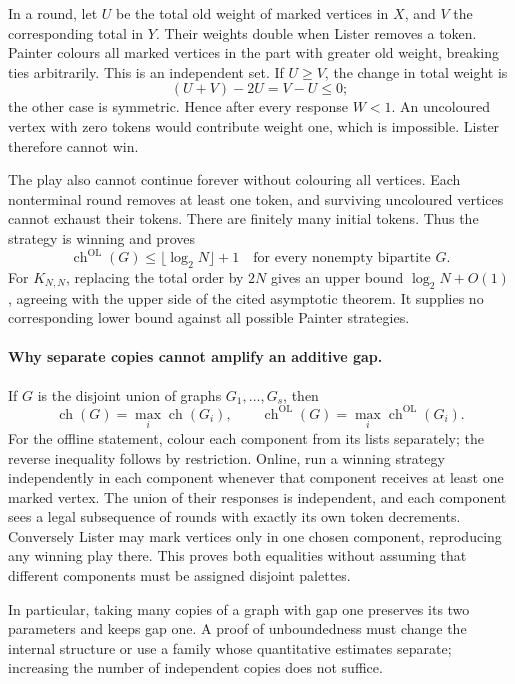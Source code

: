 \documentclass[11pt,a4paper]{article}
\begin{document}
In a round, let $U$ be the total old weight of marked vertices in
$X$, and $V$ the corresponding total in $Y$. Their weights double
when Lister removes a token. Painter colours all marked vertices in
the part with greater old weight, breaking ties arbitrarily. This is
an independent set. If $U\ge V$, the change in total weight is
\[
 (U+V)-2U=V-U\le0;
\]
the other case is symmetric. Hence after every response $W<1$.
An uncoloured vertex with zero tokens would contribute weight one,
which is impossible. Lister therefore cannot win.

The play also cannot continue forever without colouring all vertices.
Each nonterminal round removes at least one token, and surviving
uncoloured vertices cannot exhaust their tokens. There are finitely
many initial tokens. Thus the strategy is winning and proves
\[
 \operatorname{ch}^{\mathrm{OL}}(G)
 \le\lfloor\log_2N\rfloor+1
 \quad\text{for every nonempty bipartite }G.
\]
For $K_{N,N}$, replacing the total order by $2N$ gives an upper
bound $\log_2N+O(1)$, agreeing with the upper side of the cited
asymptotic theorem. It supplies no corresponding lower bound against
all possible Painter strategies.

\paragraph{Why separate copies cannot amplify an additive gap.}
If $G$ is the disjoint union of graphs $G_1,\ldots,G_s$, then
\[
 \operatorname{ch}(G)=\max_i\operatorname{ch}(G_i),\qquad
 \operatorname{ch}^{\mathrm{OL}}(G)=
 \max_i\operatorname{ch}^{\mathrm{OL}}(G_i).
\]
For the offline statement, colour each component from its lists
separately; the reverse inequality follows by restriction. Online,
run a winning strategy independently in each component whenever that
component receives at least one marked vertex. The union of their
responses is independent, and each component sees a legal subsequence
of rounds with exactly its own token decrements. Conversely Lister
may mark vertices only in one chosen component, reproducing any winning
play there. This proves both equalities without assuming that different
components must be assigned disjoint palettes.

In particular, taking many copies of a graph with gap one preserves
its two parameters and keeps gap one. A proof of unboundedness must
change the internal structure or use a family whose quantitative
estimates separate; increasing the number of independent copies does
not suffice.
\end{document}
